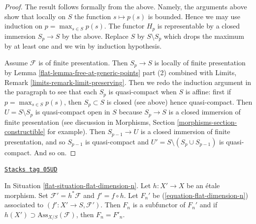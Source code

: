 \begin{proof}
\medskip\noindent
The result follows formally from the above.
Namely, the arguments above show that locally on $S$ the function
$s \mapsto p(s)$ is bounded. Hence we may use induction
on $p = \max_{s \in S} p(s)$. The functor $H_p$ is representable
by a closed immersion $S_p \to S$ by the above. Replace $S$ by
$S \setminus S_p$ which drops the maximum by at least one and
we win by induction hypothesis.

\medskip\noindent
Assume $\mathcal{F}$ is of finite presentation.
Then $S_p \to S$ is locally of finite presentation by
Lemma \ref{flat-lemma-free-at-generic-points} part (2) combined with
Limits, Remark \ref{limits-remark-limit-preserving}.
Then we redo the induction argument in the paragraph to
see that each $S_p$ is quasi-compact when $S$ is affine:
first if $p = \max_{s \in S} p(s)$, then $S_p \subset S$
is closed (see above) hence quasi-compact. Then $U = S \setminus S_p$
is quasi-compact open in $S$ because $S_p \to S$ is a closed
immersion of finite presentation (see discussion in Morphisms, Section
\ref{morphisms-section-constructible} for example). Then $S_{p - 1} \to U$
is a closed immersion of finite presentation, and so $S_{p - 1}$
is quasi-compact and $U' = S \setminus (S_p \cup S_{p - 1})$
is quasi-compact. And so on.
\end{proof}

\begin{lemma}
\label{flat-lemma-localize-flat-dimension-n}
\href{https://stacks.math.columbia.edu/tag/05UD}{\texttt{Stacks tag 05UD}}

In Situation \ref{flat-situation-flat-dimension-n}.
Let $h : X' \to X$ be an \'etale morphism.
Set $\mathcal{F}' = h^*\mathcal{F}$ and $f' = f \circ h$.
Let $F_n'$ be (\ref{equation-flat-dimension-n})
associated to $(f' : X' \to S, \mathcal{F}')$.
Then $F_n$ is a subfunctor of $F_n'$ and if
$h(X') \supset \text{Ass}_{X/S}(\mathcal{F})$, then $F_n = F'_n$.
\end{lemma}


